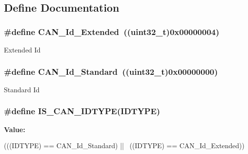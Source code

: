 \subsection{Define Documentation}
\hypertarget{group__CAN__identifier__type_gaf6c5c0b43b968fed17fd90246912b1a7}{
\subsubsection[{CAN\_\-Id\_\-Extended}]{\setlength{\rightskip}{0pt plus 5cm}\#define CAN\_\-Id\_\-Extended~((uint32\_\-t)0x00000004)}}
\label{group__CAN__identifier__type_gaf6c5c0b43b968fed17fd90246912b1a7}
Extended Id \hypertarget{group__CAN__identifier__type_ga151d9df8a6f361d0a3231593726b5a13}{
\subsubsection[{CAN\_\-Id\_\-Standard}]{\setlength{\rightskip}{0pt plus 5cm}\#define CAN\_\-Id\_\-Standard~((uint32\_\-t)0x00000000)}}
\label{group__CAN__identifier__type_ga151d9df8a6f361d0a3231593726b5a13}
Standard Id \hypertarget{group__CAN__identifier__type_gab845f7fbcf6ff8cf3d025210eb8900e4}{
\subsubsection[{IS\_\-CAN\_\-IDTYPE}]{\setlength{\rightskip}{0pt plus 5cm}\#define IS\_\-CAN\_\-IDTYPE(IDTYPE)}}
\label{group__CAN__identifier__type_gab845f7fbcf6ff8cf3d025210eb8900e4}
{\bfseries Value:}
\begin{DoxyCode}
(((IDTYPE) == CAN_Id_Standard) || \
                               ((IDTYPE) == CAN_Id_Extended))
\end{DoxyCode}
